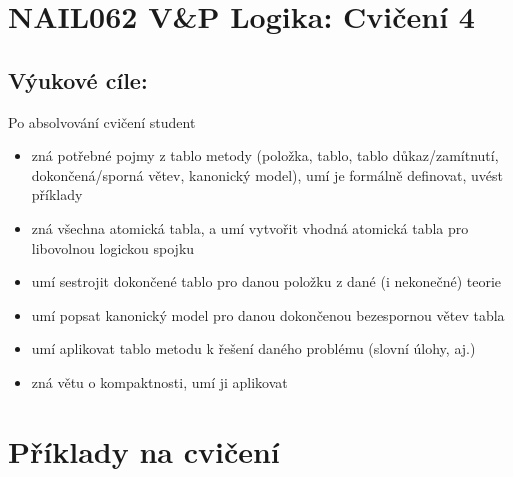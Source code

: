 \documentclass[a4paper,11pt]{amsart}
\begin{document}
\section*{NAIL062 V\&P Logika: Cvičení 4}



\subsection*{Výukové cíle:} Po absolvování cvičení student

    \begin{itemize}\setlength{\itemsep}{0pt}
        \item zná potřebné pojmy z tablo metody (položka, tablo, tablo důkaz/zamítnutí, dokončená/sporná větev, kanonický model), umí je formálně definovat, uvést příklady
        \item zná všechna atomická tabla, a umí vytvořit vhodná atomická tabla pro libovolnou logickou spojku
        \item umí sestrojit dokončené tablo pro danou položku z dané (i nekonečné) teorie
        \item umí popsat kanonický model pro danou dokončenou bezespornou větev tabla
        \item umí aplikovat tablo metodu k řešení daného problému (slovní úlohy, aj.)
        \item zná větu o kompaktnosti, umí ji aplikovat
    \end{itemize}
    

\section*{Příklady na cvičení}
\end{document}

